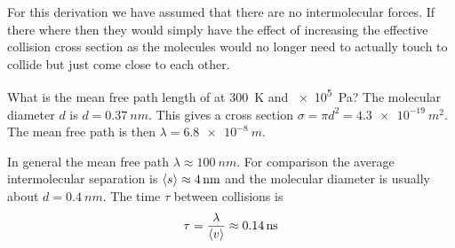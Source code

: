 \documentclass{article}
\begin{document}
    For this derivation we have assumed that there are no intermolecular forces.
    If there where then they would simply have the effect of increasing the effective collision cross section as the molecules would no longer need to actually touch to collide but just come close to each other.
    
    \example
    What is the mean free path length of  at \SI{300}{K} and \SI{e5}{Pa}?
    The molecular diameter \(d\) is \(d = \SI{0.37}{nm}\).
    This gives a cross section \(\sigma = \pi d^2 = \SI{4.3e-19}{m^2}\).
    The mean free path is then \(\lambda = \SI{6.8e-8}{m}\).
    
    In general the mean free path \(\lambda\approx \SI{100}{nm}\).
    For comparison the average intermolecular separation is \(\left\langle{s}\right\rangle \approx \SI{4}{nm}\) and the molecular diameter is usually about \(d = \SI{0.4}{nm}\).
    The time \(\tau\) between collisions is
    \[\tau = \frac{\lambda}{\left\langle{v}\right\rangle} \approx \SI{0.14}{ns}\]
    
\end{document}
